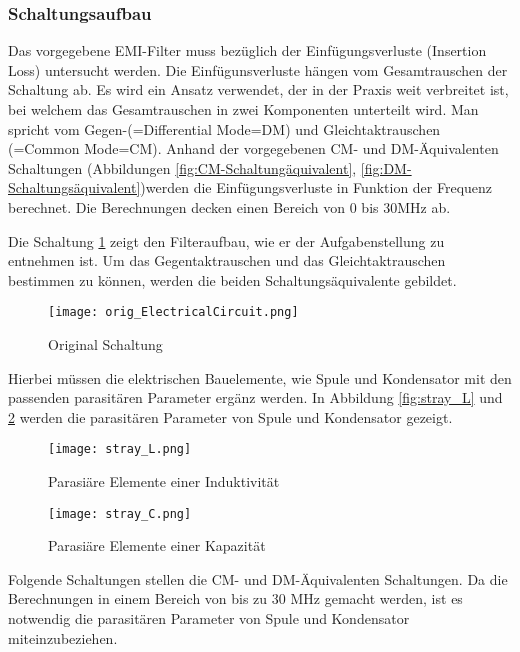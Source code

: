 \subsubsection{Schaltungsaufbau} \label{subsec:schaltungsaufbau}

Das vorgegebene EMI-Filter muss bezüglich der Einfügungsverluste (Insertion Loss) untersucht werden. Die Einfügunsverluste hängen vom Gesamtrauschen der Schaltung ab. Es wird ein Ansatz verwendet, der in der Praxis weit verbreitet ist, bei welchem das Gesamtrauschen in zwei Komponenten unterteilt wird. Man spricht vom Gegen-(=Differential Mode=DM) und Gleichtaktrauschen (=Common Mode=CM). Anhand der vorgegebenen CM- und DM-Äquivalenten Schaltungen (Abbildungen \ref{fig:CM-Schaltungäquivalent}, \ref{fig:DM-Schaltungsäquivalent})werden die Einfügungsverluste in Funktion der Frequenz berechnet. Die Berechnungen decken einen Bereich von 0 bis 30MHz ab. 


 
\newpage

Die Schaltung \ref{fig:orig_Schaltung}  zeigt den Filteraufbau, wie er der Aufgabenstellung zu entnehmen ist. Um das Gegentaktrauschen und das Gleichtaktrauschen bestimmen zu können, werden die beiden Schaltungsäquivalente gebildet. 
\begin{figure}[H]
	\centering
	\texttt{[image: orig\_ElectricalCircuit.png]}
	\caption{Original Schaltung \cite{aufgabenstellung}}
	\label{fig:orig_Schaltung}
\end{figure}
Hierbei müssen die elektrischen Bauelemente, wie Spule und Kondensator mit den passenden parasitären Parameter ergänz werden. In Abbildung \ref{fig:stray_L} und \ref{fig:stray_C} werden die parasitären Parameter von Spule und Kondensator gezeigt.
\begin{figure}[H]
	\begin{minipage}[h]{0.45\linewidth}
		\centering
		\texttt{[image: stray\_L.png]}
		\label{fig:stray_L}
		\caption{Parasiäre Elemente einer Induktivität \cite{aufgabenstellung}}
	\end{minipage}
	\begin{minipage}[h]{0.45\linewidth}
		\centering
		\texttt{[image: stray\_C.png]}
		\label{fig:stray_C}
		\caption{Parasiäre Elemente einer Kapazität \cite{aufgabenstellung}}
	\end{minipage}
\end{figure}
Folgende Schaltungen stellen die CM- und DM-Äquivalenten Schaltungen. Da die Berechnungen in einem Bereich von bis zu 30 MHz gemacht werden, ist es notwendig die parasitären Parameter von Spule und Kondensator miteinzubeziehen.

